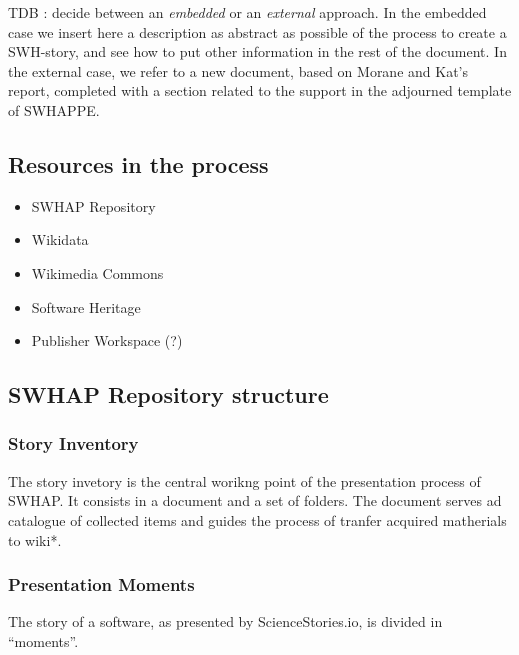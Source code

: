 \documentclass[]{article}
\providecommand{\tightlist}{%
  \setlength{\itemsep}{0pt}\setlength{\parskip}{0pt}}
\begin{document}
TDB : decide between an \emph{embedded} or an \emph{external} approach.
In the embedded case we insert here a description as abstract as
possible of the process to create a SWH-story, and see how to put other
information in the rest of the document. In the external case, we refer
to a new document, based on Morane and Kat's report, completed with a
section related to the support in the adjourned template of SWHAPPE.

\hypertarget{resources-in-the-process}{%
\subsection{Resources in the process}\label{resources-in-the-process}}

\begin{itemize}
\tightlist
\item
  SWHAP Repository
\item
  Wikidata
\item
  Wikimedia Commons
\item
  Software Heritage
\item
  Publisher Workspace (?)
\end{itemize}

\hypertarget{swhap-repository-structure}{%
\subsection{SWHAP Repository
structure}\label{swhap-repository-structure}}

\hypertarget{story-inventory}{%
\subsubsection{\texorpdfstring{\textbf{Story
Inventory}}{Story Inventory}}\label{story-inventory}}

The story invetory is the central worikng point of the presentation
process of SWHAP. It consists in a document and a set of folders. The
document serves ad catalogue of collected items and guides the process
of tranfer acquired matherials to wiki*.

\hypertarget{presentation-moments}{%
\subsubsection{\texorpdfstring{\textbf{Presentation
Moments}}{Presentation Moments}}\label{presentation-moments}}

The story of a software, as presented by ScienceStories.io, is divided
in ``moments''.
\end{document}
